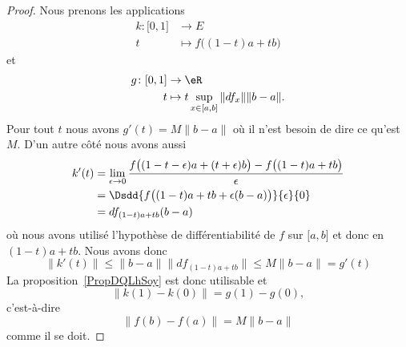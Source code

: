 \begin{proof}
    Nous prenons les applications
    \begin{equation}
        \begin{aligned}
            k\colon \mathopen[ 0 , 1 \mathclose]&\to E \\
            t&\mapsto f\big( (1-t)a+tb \big)
        \end{aligned}
    \end{equation}
    et
    \begin{equation}
        \begin{aligned}
            g\colon \mathopen[ 0 , 1 \mathclose]&\to \eR \\
            t&\mapsto t\sup_{x\in\mathopen[ a , b \mathclose]}\| df_x \|\| b-a \|.
        \end{aligned}
    \end{equation}
    Pour tout \( t\) nous avons \( g'(t)=M\| b-a \|\) où il n'est besoin de dire ce qu'est \( M\). D'un autre côté nous avons aussi
    \begin{equation}
        \begin{aligned}[]
            k'(t)&=\lim_{\epsilon\to 0}\frac{ f\big( (1-t-\epsilon)a+(t+\epsilon)b \big)-f\big( (1-t)a+tb \big) }{ \epsilon }\\
            &=\Dsdd{ f\big( (1-t)a+tb+\epsilon(b-a) \big)  }{\epsilon}{0}\\
            &=df_{(1-t)a+tb}(b-a)
        \end{aligned}
    \end{equation}
    où nous avons utilisé l'hypothèse de différentiabilité de \( f\) sur \( \mathopen[ a , b \mathclose]\) et donc en \( (1-t)a+tb\). Nous avons donc
    \begin{equation}
        \| k'(t) \|\leq \| b-a \|\| df_{(1-t)a+tb} \|\leq M\| b-a \|=g'(t)
    \end{equation}
    La proposition~\ref{PropDQLhSoy} est donc utilisable et
    \begin{equation}
        \| k(1)-k(0) \|=g(1)-g(0),
    \end{equation}
    c'est-à-dire
    \begin{equation}
        \| f(b)-f(a) \|=M\| b-a \|
    \end{equation}
    comme il se doit.
\end{proof}

